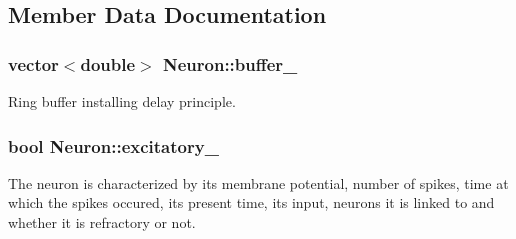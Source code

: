 \subsection{Member Data Documentation}
\hypertarget{classNeuron_ab2abc06234893064464b0c5ac4374ada}{
\subsubsection[{buffer\-\_\-}]{\setlength{\rightskip}{0pt plus 5cm}vector$<$double$>$ Neuron\-::buffer\-\_\-\hspace{0.3cm}{\ttfamily [private]}}}\label{classNeuron_ab2abc06234893064464b0c5ac4374ada}
Ring buffer installing delay principle. \hypertarget{classNeuron_a4450ff3bd20d2e5b4f74746068b8d461}{
\subsubsection[{excitatory\-\_\-}]{\setlength{\rightskip}{0pt plus 5cm}bool Neuron\-::excitatory\-\_\-\hspace{0.3cm}{\ttfamily [private]}}}\label{classNeuron_a4450ff3bd20d2e5b4f74746068b8d461}
The neuron is characterized by its membrane potential, number of spikes, time at which the spikes occured, its present time, its input, neurons it is linked to and whether it is refractory or not.

